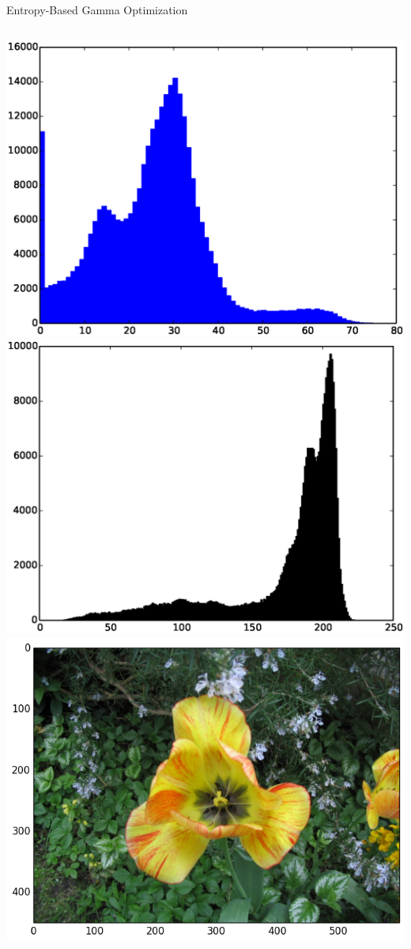 \documentclass[compress,aspectratio=43]{beamer}
\begin{document}
\begin{frame}{Entropy-Based Gamma Optimization}
\begin{columns}[t]
\includegraphics[width=1\linewidth]{figures/gamma/banana/banana1-b.eps}\\
\includegraphics[width=1\linewidth]{figures/gamma/banana/banana1-h.eps}
\includegraphics[width=1\linewidth]{figures/gamma/flower/flower-rgb.png}\\

\end{columns}
\end{frame}
\end{document}
